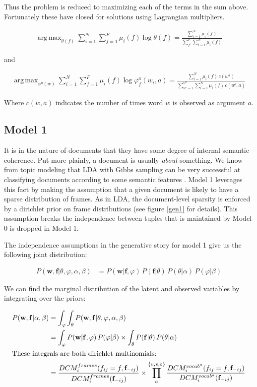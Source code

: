 \documentclass{article} %
\renewcommand\phi\varphi
\DeclareMathOperator*{\argmax}{arg\,max}
\begin{document}
Thus the problem is reduced to maximizing each of the terms in the sum above. Fortunately
these have closed for solutions using Lagrangian multipliers.


\begin{align}
\argmax_{\theta(f)}\sum_{i=1}^N\sum_{f=1}^F\mu_i(f)\log\theta(f)
= \frac{\sum_{i=1}^N\mu_i(f)}{\sum_{f'}^F\sum_{i=1}^N\mu_i(f)}
\end{align}

and

\begin{align}
\argmax_{\phi^a(w)}\sum_{i=1}^N\sum_{f=1}^F\mu_i(f)\log \phi_f^a(w_i,a)
= \frac{\sum_{i=1}^N \mu_i(f)\,c(w^a)}{\sum_{w'=1}^{V^a}\sum_{i=1}^N \mu_i(f)\,c(w',a)}
\end{align}

Where $c(w,a)$ indicates the number of times word $w$ is observed as argument $a$.

\subsection{Model 1}

It is in the nature of documents that they have some degree of internal semantic
coherence. Put more plainly, a document is usually \emph{about} something. We
know from topic modeling that LDA with Gibbs sampling can be very successful at
classifying documents according to some semantic features \citep{blei2003}.
Model 1 leverages this fact by making the assumption that a given document is 
likely to have a sparse distribution of frames. As in LDA, the document-level
sparsity is enforced by a dirichlet prior on frame distributions (see figure
\ref{gen1} for details). This assumption breaks the independence between tuples 
that is maintained by Model 0 is dropped in Model 1.

The independence assumptions in the generative story for model 1 give us the 
following joint distribution:

\begin{align*}
P(\mathbf{w},\mathbf{f}|\theta,\phi,\alpha,\beta)
&=P(\mathbf{w}|\mathbf{f},\phi)\,P(\mathbf{f}|\theta)\,P(\theta|\alpha)\,P(\phi|\beta)
\end{align*}

We can find the marginal distribution of the latent and observed variables by
integrating over the priors:

\begin{align*}
 P(\mathbf{w},\mathbf{f}|\alpha,\beta)
&=\int_\phi\int_\theta P(\mathbf{w},\mathbf{f}|\theta,\phi,\alpha,\beta)\\
&=     \int_\phi P(\mathbf{w}|\mathbf{f},\phi )\,P(\phi|\beta)
\times \int_\theta P(\mathbf{f}|\theta)\,P(\theta|\alpha)\\
\intertext{These integrals are both dirichlet multinomials:}
&=\frac{DCM_i^{frames}(f_{ij}=f, \mathbf{f}_{-ij})}{DCM_i^{frames}(\mathbf{f}_{-ij})}\times
\prod_a^{\{v,s,o\}}\frac{DCM_i^{vocab^a}(f_{ij}=f, \mathbf{f}_{-ij})}{DCM_i^{vocab^a}(\mathbf{f}_{-ij})}
\end{align*}
\end{document}
